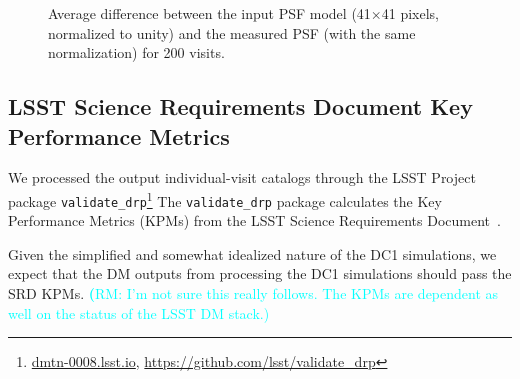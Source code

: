 \documentclass[twocolumn]{aastex62}
\newcommand{\rachel}[1]{{\textcolor{cyan}{{\textbf (RM: #1)}}}}
\begin{document}
\begin{figure}
\centering
{}

\caption{Average difference between the input PSF model (41$\times$41 pixels, normalized to unity) and the measured PSF (with the same normalization) for 200 visits.}
\label{fig:psf_residual}
\end{figure}

\subsection{LSST Science Requirements Document Key Performance Metrics}

We processed the output individual-visit catalogs through the LSST Project package \texttt{validate\_drp}\footnote{\url{dmtn-0008.lsst.io}, \url{https://github.com/lsst/validate_drp}}
The \texttt{validate\_drp} package calculates the Key Performance Metrics (KPMs) from the LSST Science Requirements Document~\citep[SRD;][]{LPM-17}.

Given the simplified and somewhat idealized nature of the DC1 simulations, we expect that the DM outputs from processing the DC1 simulations should pass the SRD KPMs. \rachel{I'm not sure this really follows.  The KPMs are dependent as well on the status of the LSST DM stack.}
\end{document}
